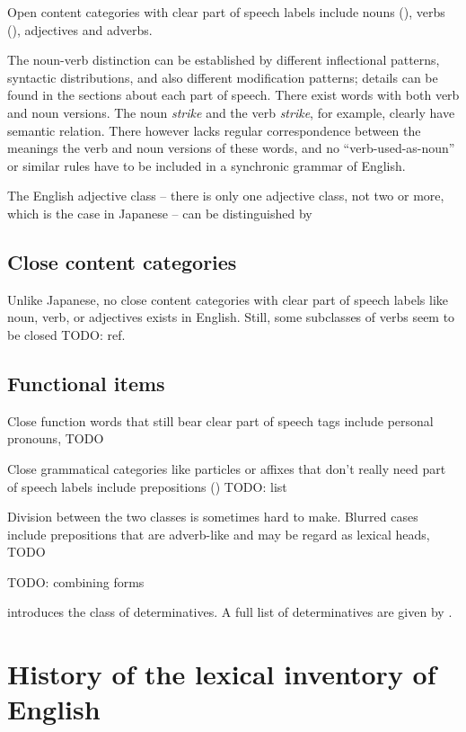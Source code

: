 \documentclass[UTF8, a4paper, oneside, scheme=plain, 12pt]{ctexbook}
\newcommand*{\citepage}[1]{p.~{#1}}
\newcommand{\form}[1]{\emph{#1}}
\begin{document}
Open content categories with clear part of speech labels
include nouns (), 
verbs (), adjectives and adverbs.

The noun-verb distinction can be established by 
different inflectional patterns, syntactic distributions,
and also different modification patterns;
details can be found in the sections about each part of speech.
There exist words with both verb and noun versions.
The noun \form{strike} and the verb \form{strike}, for example,
clearly have semantic relation.
There however lacks regular correspondence between the meanings 
the verb and noun versions of these words, 
and no ``verb-used-as-noun'' or similar rules have to be included 
in a synchronic grammar of English.

The English adjective class -- there is only one adjective class, not two or more,
which is the case in Japanese -- 
can be distinguished by 

\subsection{Close content categories}

Unlike Japanese, no close content categories with clear part of speech labels 
like noun, verb, or adjectives exists in English.
Still, some subclasses of verbs seem to be closed TODO: ref.

\subsection{Functional items}

Close function words that still bear clear part of speech tags  
include personal pronouns, TODO

Close grammatical categories like particles or affixes that don't really need part of speech labels
include prepositions () TODO: list

Division between the two classes 
is sometimes hard to make.
Blurred cases include 
prepositions that are adverb-like and may be regard as lexical heads, TODO

TODO: combining forms \citep[\citepage{1661}]{cgel}


\citet[\citepage{330}]{cgel} introduces the class of determinatives.
A full list of determinatives are given by \citet[\citepage{356}]{cgel}.

\section{History of the lexical inventory of English}\label{sec:pos.inventory}
\end{document}
